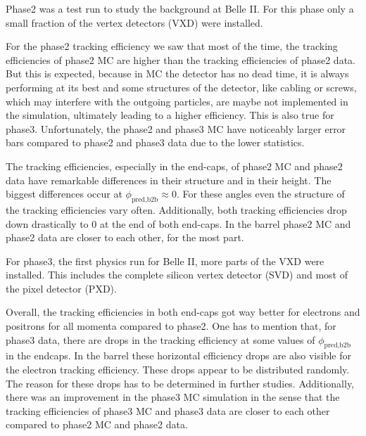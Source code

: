 \documentclass[a4paper,11pt,twosided,final,german,openbib,pdftex,listof=totoc,bibliography=totoc]{scrbook}
\begin{document}
Phase2 was a test run to study the background at Belle II. For this phase only a small fraction of the vertex detectors (VXD) were installed.

For the phase2 tracking efficiency we saw that most of the time, the tracking efficiencies of phase2 MC are higher than the tracking efficiencies of phase2 data. But this is expected, because in MC the detector has no dead time, it is always performing at its best and some structures of the detector, like cabling or screws, which may interfere with the outgoing particles, are maybe not implemented in the simulation, ultimately leading to a higher efficiency. This is also true for phase3. Unfortunately, the phase2 and phase3 MC have noticeably larger error bars compared to phase2 and phase3 data due to the lower statistics.
\newline

The tracking efficiencies, especially in the end-caps, of phase2 MC and phase2 data have remarkable differences in their structure and in their height. The biggest differences occur at $\phi_{\textrm{pred,b2b}} \approx 0$. For these angles even the structure of the tracking efficiencies vary often. Additionally, both tracking efficiencies drop down drastically to 0 at the end of both end-caps. In the barrel phase2 MC and phase2 data are closer to each other, for the most part.
\newline

For phase3, the first physics run for Belle II, more parts of the VXD were installed. This includes the complete silicon vertex detector (SVD) and most of the pixel detector (PXD). 

Overall, the tracking efficiencies in both end-caps got way better for electrons and positrons for all momenta compared to phase2. One has to mention that, for phase3 data, there are drops in the tracking efficiency at some values of $\phi_{\textrm{pred,b2b}}$ in the endcaps.
In the barrel these horizontal efficiency drops are also visible for the electron tracking efficiency.
These drops appear to be distributed randomly. The reason for these drops has to be determined in further studies. Additionally, there was an improvement in the phase3 MC simulation in the sense that the tracking efficiencies of phase3 MC and phase3 data are closer to each other compared to phase2 MC and phase2 data.

 
 
\end{document}
